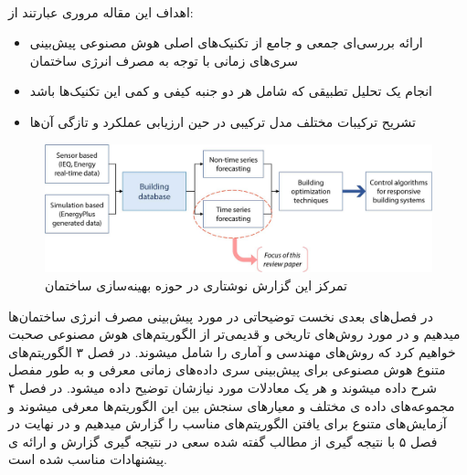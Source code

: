 \\[3em]
\noindent
اهداف این مقاله مروری عبارتند از:
\begin{itemize}
    \item ارائه بررسی‌ای جمعی و جامع از تکنیک‌های اصلی هوش مصنوعی پیش‌بینی سری‌های ‌ز‌‌مانی با توجه به مصرف انرژی ساختمان
    \item انجام یک تحلیل تطبیقی که شامل هر دو جنبه کیفی و کمی این تکنیک‌ها باشد
    \item تشریح ترکیبات مختلف مدل ترکیبی در حین ارزیابی عملکرد و تازگی آن‌ها
\end{itemize}
\begin{figure}[ht!]
    \begin{center}
        \includegraphics[width=14cm]{images/illustration.jpg}
    \end{center}
    \caption[‌اهمیت پیش‌بینی انرژی ساختمان‌ها برای بهینه سازی ساختمان‌ها]{تمرکز این گزارش نوشتاری در حوزه بهینه‌سازی ساختمان
     \cite{DEB2017902}}
    \label{fig:dc}
    \end{figure}

\noindent
در فصل‌های بعدی نخست توضیحاتی در مورد پیش‌بینی مصرف انرژی ساختمان‌ها میدهیم و در مورد روش‌های تاریخی و قدیمی‌تر از 
الگوریتم‌های هوش‌ مصنوعی صحبت خواهیم کرد که روش‌های مهندسی و آماری را شامل میشوند. در فصل ۳ الگوریتم‌های متنوع هوش مصنوعی برای پیش‌بینی سری داده‌های زمانی معرفی و به طور مفصل شرح داده میشوند و هر یک 
معادلات مورد نیازشان توضیح داده میشود. در فصل ۴ مجموعه‌های داده ی مختلف و معیار‌های سنجش بین این الگوریتم‌ها معرفی میشوند و آزمایش‌های متنوع 
برای یافتن الگوریتم‌های مناسب را گزارش میدهیم و در نهایت در فصل ۵ با نتیجه گیری از مطالب گفته شده سعی در نتیجه گیری گزارش و ارائه ی پیشنهادات مناسب شده است.